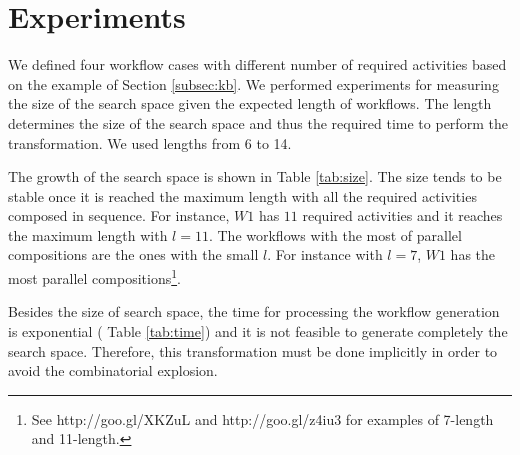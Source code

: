 
\section{Experiments} \label{sec:experiments}

We defined four workflow cases with different number of required activities based on the example of Section \ref{subsec:kb}. We performed experiments for measuring the size of the search space given the expected length of workflows. The length determines the size of the search space and thus the required time to perform the transformation. We used lengths from 6 to 14.

The growth of the search space is shown in Table \ref{tab:size}. The size tends to be stable once it is reached the maximum length with all the required activities composed in sequence. For instance, $W1$ has $11$ required activities and it reaches the maximum length with $l=11$. The workflows with the most of parallel compositions are the ones with the small $l$. For instance with $l=7$, $W1$ has the most parallel compositions\footnote{See http://goo.gl/XKZuL and http://goo.gl/z4iu3 for examples of 7-length and 11-length.}.




Besides the size of search space, the time for processing the workflow generation is exponential (\cf{} Table \ref{tab:time}) and it is not feasible to generate completely the search space. Therefore, this transformation must be done implicitly in order to avoid the combinatorial explosion.

